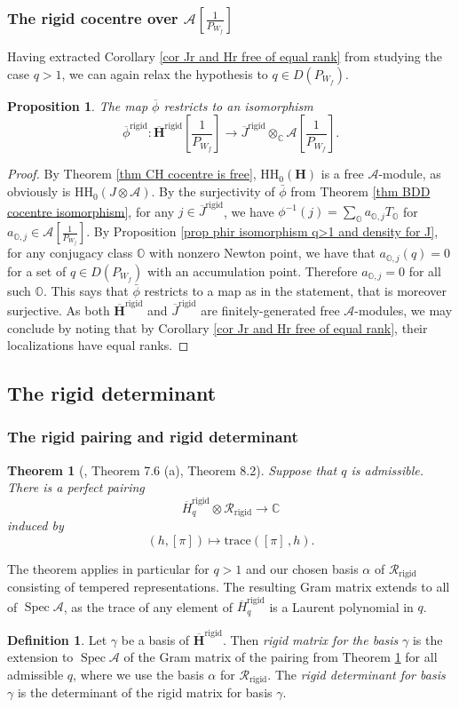 \documentclass[10pt]{article}
\DeclareMathOperator{\Spec}{Spec}
\newcommand{\HH}{\mathbf{H}}
\newcommand{\trace}[2]{\mathrm{trace}\left({#1}\,,{#2}\right)}
\newcommand{\C}{\mathbb{C}}
\newtheorem{theorem}{Theorem}
\newtheorem{prop}{Proposition}
\theoremstyle{definition}
\newtheorem{dfn}{Definition}
\theoremstyle{remark}
\newcommand{\Hr}{\overline{\HH}^{\mathrm{rigid}}}
\newcommand{\Hrq}{\overline{H}^{\mathrm{rigid}}_q}
\newcommand{\phir}{\overline{\phi}^{\mathrm{rigid}}}
\newcommand{\Jr}{\overline{J}^{\mathrm{rigid}}}
\newcommand{\RHr}{\mathcal{R}_{\mathrm{rigid}}}
\newcommand{\hhh}{\mathrm{HH}_0}
\newcommand{\oO}{\mathbb{O}}
\begin{document}
\subsubsection{The rigid cocentre over $\mathcal{A}[\frac{1}{P_{W_f}}]$}
Having extracted Corollary \ref{cor Jr and Hr free of equal rank} from studying the case $q>1$, we can 
again relax the hypothesis to $q\in D(P_{W_f})$.
%
\begin{prop}
\label{prop phir restricts to isomorphism}
The map $\overline{\phi}$ restricts to an isomorphism
%
\[
\phir\colon \Hr\left[\frac{1}{P_{W_f}}\right]\to\Jr\otimes_\C\mathcal{A}\left[\frac{1}{P_{W_f}}\right].
\]
%
\end{prop}
%
\begin{proof}
By Theorem \ref{thm CH cocentre is free}, $\hhh(\HH)$ is a free $\mathcal{A}$-module, as obviously is 
$\hhh(J\otimes\mathcal{A})$. By the surjectivity of $\bar{\phi}$ from Theorem 
\ref{thm BDD cocentre isomorphism}, for any $j\in\Jr$, we have 
$
\phi^{-1}(j)=\sum_{\oO}a_{\oO,j}T_{\oO}
$
for $a_{\oO,j}\in\mathcal{A}\left[\frac{1}{P_{W_f}}\right]$. By Proposition \ref{prop phir isomorphism q>1 and density for J}, 
for any conjugacy class $\oO$ with nonzero Newton point, we have that 
$a_{\oO,j}(q)=0$  for a set of $q\in 
D(P_{W_f})$ with an accumulation point. Therefore $a_{\oO,j}=0$ for all such 
$\oO$. This says that $\bar{\phi}$ restricts to a map 
as in the statement, that is moreover surjective. As both $\Hr$ and $\Jr$ are finitely-generated free 
$\mathcal{A}$-modules, we may conclude by noting that by Corollary 
\ref{cor Jr and Hr free of equal rank}, their localizations have equal ranks.
%
\end{proof}
%
\subsection{The rigid determinant}
%
\subsubsection{The rigid pairing and rigid determinant}
%
\begin{theorem}[\cite{CH}, Theorem 7.6 (a), Theorem 8.2]
\label{thm CH rigid pairing}
Suppose that $q$ is admissible. There is a perfect pairing
%
\[
\Hrq\otimes\RHr\to\C
\]
%
induced by 
%
\[
(h, [\pi])\mapsto\trace{[\pi]}{h}.
\]
%
\end{theorem}
%
The theorem applies in particular for $q>1$ and our chosen basis $\alpha$ of $\RHr$ consisting
of tempered representations. The resulting Gram matrix extends to all of $\Spec\mathcal{A}$, as the trace of any element of $\Hrq$ is a Laurent polynomial in $q$.
%
\begin{dfn}
Let $\gamma$ be a basis of $\Hr$. Then \emph{rigid matrix for the basis} $\gamma$ is the extension to 
$\Spec\mathcal{A}$ of the Gram matrix of the pairing from Theorem \ref{thm CH rigid pairing} for all admissible $q$, where we use the basis $\alpha$ for $\RHr$. The \emph{rigid determinant for basis} $\gamma$ is the determinant of the rigid matrix for basis $\gamma$.
\end{dfn}
%
\end{document}
